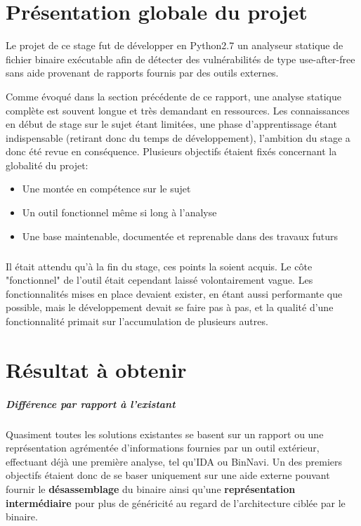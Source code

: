 \section{Présentation globale du projet}

Le projet de ce stage fut de développer en Python2.7 un analyseur statique de fichier
binaire exécutable afin de détecter des vulnérabilités de type use-after-free sans aide
provenant de rapports fournis par des outils externes.


Comme évoqué dans la section précédente de ce rapport, une analyse statique complète est souvent
longue et très demandant en ressources. Les connaissances en début de stage sur le sujet étant limitées,
une phase d'apprentissage étant indispensable (retirant donc du temps de développement), l'ambition du stage
a donc été revue en conséquence.\newline
Plusieurs objectifs étaient fixés concernant la globalité du projet:
\begin{itemize}
        \item Une montée en compétence sur le sujet
        \item Un outil fonctionnel même si long à l'analyse
        \item Une base maintenable, documentée et reprenable dans des travaux futurs
\end{itemize}
\subparagraph{}

Il était attendu qu'à la fin du stage, ces points la soient acquis. Le côte "fonctionnel"
de l'outil était cependant laissé volontairement vague. Les fonctionnalités mises en place
devaient exister, en étant aussi performante que possible, mais le développement devait se faire
pas à pas, et la qualité d'une fonctionnalité primait sur l'accumulation de plusieurs autres.

\section{Résultat à obtenir}

\subparagraph{Différence par rapport à l'existant}

Quasiment toutes les solutions existantes se basent sur un rapport ou une représentation agrémentée d'informations fournies
par un outil extérieur, effectuant déjà une première analyse, tel qu'IDA ou BinNavi. Un des premiers objectifs étaient donc de
se baser uniquement sur une aide externe pouvant fournir le \textbf{désassemblage} du binaire ainsi qu'une \textbf{représentation intermédiaire}
pour plus de généricité au regard de l'architecture ciblée par le binaire.

